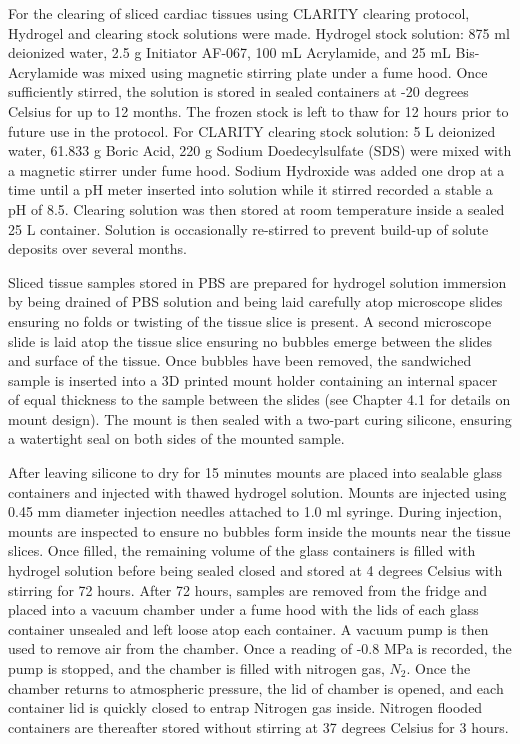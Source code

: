 For the clearing of sliced cardiac tissues using CLARITY clearing protocol, Hydrogel and clearing stock solutions were made. Hydrogel stock solution: 875 ml deionized water, 2.5 g Initiator AF-067, 100 mL Acrylamide, and 25 mL Bis-Acrylamide was mixed using magnetic stirring plate under a fume hood. Once sufficiently stirred, the solution is stored in sealed containers at -20 degrees Celsius for up to 12 months. The frozen stock is left to thaw for 12 hours prior to future use in the protocol. 
For CLARITY clearing stock solution: 5 L deionized water, 61.833 g Boric Acid, 220 g Sodium Doedecylsulfate (SDS) were mixed with a magnetic stirrer under fume hood. Sodium Hydroxide was added one drop at a time until a pH meter inserted into solution while it stirred recorded a stable a pH of 8.5. Clearing solution was then stored at room temperature inside a sealed 25 L container. Solution is occasionally re-stirred to prevent build-up of solute deposits over several months.

Sliced tissue samples stored in PBS are prepared for hydrogel solution immersion by being drained of PBS solution and being laid carefully atop microscope slides ensuring no folds or twisting of the tissue slice is present. A second microscope slide is laid atop the tissue slice ensuring no bubbles emerge between the slides and surface of the tissue. Once bubbles have been removed, the sandwiched sample is inserted into a 3D printed mount holder containing an internal spacer of equal thickness to the sample between the slides (see Chapter 4.1 for details on mount design). The mount is then sealed with a two-part curing silicone, ensuring a watertight seal on both sides of the mounted sample. 

After leaving silicone to dry for 15 minutes mounts are placed into sealable glass containers and injected with thawed hydrogel solution. Mounts are injected using 0.45 mm diameter injection needles attached to 1.0 ml syringe. During injection, mounts are inspected to ensure no bubbles form inside the mounts near the tissue slices. Once filled, the remaining volume of the glass containers is filled with hydrogel solution before being sealed closed and stored at 4 degrees Celsius with stirring for 72 hours. 
After 72 hours, samples are removed from the fridge and placed into a vacuum chamber under a fume hood with the lids of each glass container unsealed and left loose atop each container. A vacuum pump is then used to remove air from the chamber. Once a reading of -0.8 MPa is recorded, the pump is stopped, and the chamber is filled with nitrogen gas, $N_2$. Once the chamber returns to atmospheric pressure, the lid of chamber is opened, and each container lid is quickly closed to entrap Nitrogen gas inside. Nitrogen flooded containers are thereafter stored without stirring at 37 degrees Celsius for 3 hours. 

